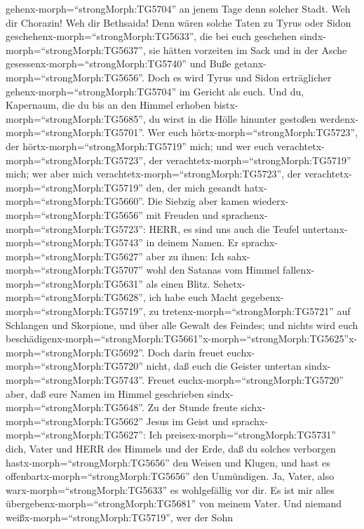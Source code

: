 gehenx-morph=``strongMorph:TG5704'' an jenem Tage denn solcher Stadt.
 Weh dir Chorazin! Weh dir Bethsaida! Denn wären solche
Taten zu Tyrus oder Sidon geschehenx-morph=``strongMorph:TG5633'', die
bei euch geschehen sindx-morph=``strongMorph:TG5637'', sie hätten
vorzeiten im Sack und in der Asche
gesessenx-morph=``strongMorph:TG5740'' und Buße
getanx-morph=``strongMorph:TG5656''.  Doch es wird Tyrus
und Sidon erträglicher gehenx-morph=``strongMorph:TG5704'' im Gericht
als euch.  Und du, Kapernaum, die du bis an den Himmel
erhoben bistx-morph=``strongMorph:TG5685'', du wirst in die Hölle
hinunter gestoßen werdenx-morph=``strongMorph:TG5701''. 
Wer euch hörtx-morph=``strongMorph:TG5723'', der
hörtx-morph=``strongMorph:TG5719'' mich; und wer euch
verachtetx-morph=``strongMorph:TG5723'', der
verachtetx-morph=``strongMorph:TG5719'' mich; wer aber mich
verachtetx-morph=``strongMorph:TG5723'', der
verachtetx-morph=``strongMorph:TG5719'' den, der mich gesandt
hatx-morph=``strongMorph:TG5660''.  Die Siebzig aber kamen
wiederx-morph=``strongMorph:TG5656'' mit Freuden und
sprachenx-morph=``strongMorph:TG5723'': HERR, es sind uns auch die
Teufel untertanx-morph=``strongMorph:TG5743'' in deinem Namen.
 Er sprachx-morph=``strongMorph:TG5627'' aber zu ihnen: Ich
sahx-morph=``strongMorph:TG5707'' wohl den Satanas vom Himmel
fallenx-morph=``strongMorph:TG5631'' als einen Blitz. 
Sehetx-morph=``strongMorph:TG5628'', ich habe euch Macht
gegebenx-morph=``strongMorph:TG5719'', zu
tretenx-morph=``strongMorph:TG5721'' auf Schlangen und Skorpione, und
über alle Gewalt des Feindes; und nichts wird euch
beschädigenx-morph=``strongMorph:TG5661''\textbar x-morph=``strongMorph:TG5625''x-morph=``strongMorph:TG5692''.
 Doch darin freuet euchx-morph=``strongMorph:TG5720''
nicht, daß euch die Geister untertan sindx-morph=``strongMorph:TG5743''.
Freuet euchx-morph=``strongMorph:TG5720'' aber, daß eure Namen im Himmel
geschrieben sindx-morph=``strongMorph:TG5648''.  Zu der
Stunde freute sichx-morph=``strongMorph:TG5662'' Jesus im Geist und
sprachx-morph=``strongMorph:TG5627'': Ich
preisex-morph=``strongMorph:TG5731'' dich, Vater und HERR des Himmels
und der Erde, daß du solches verborgen
hastx-morph=``strongMorph:TG5656'' den Weisen und Klugen, und hast es
offenbartx-morph=``strongMorph:TG5656'' den Unmündigen. Ja, Vater, also
warx-morph=``strongMorph:TG5633'' es wohlgefällig vor dir. 
Es ist mir alles übergebenx-morph=``strongMorph:TG5681'' von meinem
Vater. Und niemand weißx-morph=``strongMorph:TG5719'', wer der Sohn
